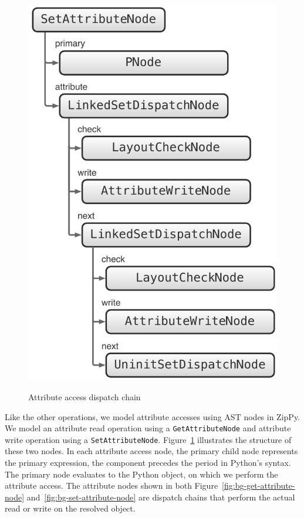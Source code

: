 \begin{figure}
{  \includegraphics[scale=.4]{figures/set-attribute-node}
  \label{fig:bg-set-attribute-node}
}
\caption{Attribute access dispatch chain}
\label{fig:bg-attribute-access-dispatch-chain}
\end{figure}

Like the other operations, we model attribute accesses using AST nodes in ZipPy.
We model an attribute read operation using a \texttt{GetAttributeNode} and attribute write operation using a \texttt{SetAttributeNode}.
Figure~\ref{fig:bg-attribute-access-dispatch-chain} illustrates the structure of these two nodes.
In each attribute access node, the \textsf{primary} child node represents the primary expression, the component precedes the period in Python's syntax.
The \textsf{primary} node evaluates to the Python object, on which we perform the attribute access.
The \textsf{attribute} nodes shown in both Figure~\ref{fig:bg-get-attribute-node} and~\ref{fig:bg-set-attribute-node} are dispatch chains that perform the actual read or write on the resolved object.

